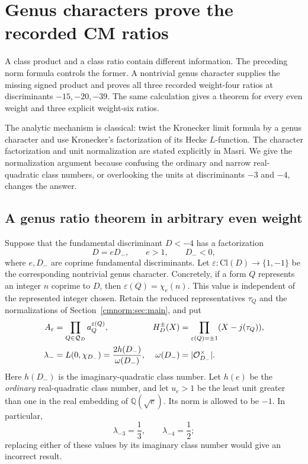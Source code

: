 
\section{Genus characters prove the recorded CM ratios}
\label{cmgenus:sec:main}

A class product and a class ratio contain different information.
The preceding norm formula controls the former. A nontrivial genus
character supplies the missing signed product and proves all three
recorded weight-four ratios at discriminants $-15,-20,-39$.
The same calculation gives a theorem for every even weight and three
explicit weight-six ratios.

The analytic mechanism is classical: twist the Kronecker limit formula
by a genus character and use Kronecker's factorization of its Hecke
$L$-function. The character factorization and unit normalization are stated explicitly
in Masri\cite[eqs.~(1.3)--(1.5)]{cmgenus:Masri}. We give the normalization argument
because confusing the ordinary and narrow real-quadratic class numbers,
or overlooking the units at discriminants $-3$ and $-4$, changes the
answer.

\subsection{A genus ratio theorem in arbitrary even weight}

Suppose that the fundamental discriminant $D<-4$ has a factorization
\[
 D=eD_-,\qquad e>1,\qquad D_-<0,
\]
where $e,D_-$ are coprime fundamental discriminants. Let
$\varepsilon:\mathrm{Cl}(D)\longrightarrow\{1,-1\}$ be the
corresponding nontrivial genus character. Concretely, if a form $Q$
represents an integer $n$ coprime to $D$, then
$\varepsilon(Q)=\chi_e(n)$. This value is independent of the represented
integer chosen. Retain the reduced representatives $\tau_Q$ and the
normalizations of Section~\ref{cmnorm:sec:main}, and put
\begin{align}
 A_\varepsilon&=\prod_{Q\in\mathcal Q_D}a_Q^{\varepsilon(Q)},&
 H_D^\pm(X)&=\prod_{\varepsilon(Q)=\pm1}(X-j(\tau_Q)),\label{cmgenus:eq:data}\\
 \lambda_-&=L(0,\chi_{D_-})
      =\frac{2h(D_-)}{\omega(D_-)},&
 \omega(D_-)&=|\mathcal O_{D_-}^{\times}|.\notag
\end{align}
Here $h(D_-)$ is the imaginary-quadratic class number. Let $h(e)$ be
the \emph{ordinary} real-quadratic class number, and let $u_e>1$ be the
least unit greater than one in the real embedding of
$\mathbb Q(\sqrt e)$. Its norm is allowed to be $-1$.
In particular,
\[
 \lambda_{-3}=\frac13,\qquad \lambda_{-4}=\frac12;
\]
replacing either of these values by its imaginary class number would
give an incorrect result.

